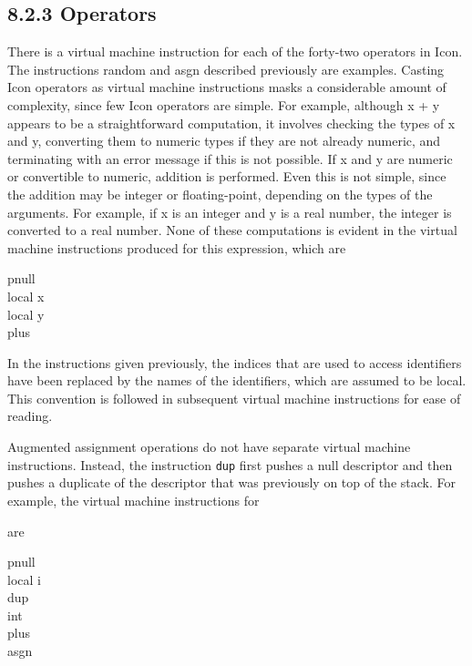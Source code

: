 \subsection[8.2.3 Operators]{8.2.3 \textbf{Operators}}

There is a virtual machine instruction for each of the forty-two
operators in Icon. The instructions random and asgn described
previously are examples. Casting Icon operators as virtual machine
instructions masks a considerable amount of complexity, since few Icon
operators are simple. For example, although x + y appears to be a
straightforward computation, it involves checking the types of x and
y, converting them to numeric types if they are not already numeric,
and terminating with an error message if this is not possible. If x
and y are numeric or convertible to numeric, addition is
performed. Even this is not simple, since the addition may be integer
or floating-point, depending on the types of the arguments. For
example, if x is an integer and y is a real number, the integer is
converted to a real number. None of these computations is evident in
the virtual machine instructions produced for this expression, which
are

\begin{iconcode}
\>pnull\\
\>local\>\>\> x\\
\>local\>\>\> y\\
\>plus
\end{iconcode}

In the instructions given previously, the indices that are used to
access identifiers have been replaced by the names of the identifiers,
which are assumed to be local. This convention is followed in
subsequent virtual machine instructions for ease of reading.

Augmented assignment operations do not have separate virtual machine
instructions. Instead, the instruction \texttt{dup} first pushes a
null descriptor and then pushes a duplicate of the descriptor that was
previously on top of the stack.  For example, the virtual machine
instructions for


are

\begin{iconcode}
\>pnull\\
\>local\>\>\> i\\
\>dup\\
\>int\>\>\\
\>plus\\
\>asgn
\end{iconcode}

